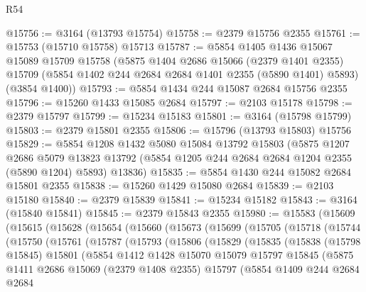 \begin{lexlean}{R54}
\begin{coremodule}
@15756 := @3164 (@13793 @15754)
@15758 := @2379 @15756 @2355
@15761 := @15753 (@15710 @15758) @15713
@15787 := @5854
    @1405
    @1436
    @15067
    @15089
    @15709
    @15758
    (@5875
      @1404
      @2686
      @15066
      (@2379 @1401 @2355)
      @15709
      (@5854 @1402 @244 @2684 @2684 @1401 @2355 (@5890 @1401) @5893)
      (@3854 @1400))
@15793 := @5854 @1434 @244 @15087 @2684 @15756 @2355
@15796 := @15260 @1433 @15085 @2684
@15797 := @2103 @15178
@15798 := @2379 @15797
@15799 := @15234 @15183
@15801 := @3164 (@15798 @15799)
@15803 := @2379 @15801 @2355
@15806 := @15796 (@13793 @15803) @15756
@15829 := @5854
    @1208
    @1432
    @5080
    @15084
    @13792
    @15803
    (@5875
      @1207
      @2686
      @5079
      @13823
      @13792
      (@5854 @1205 @244 @2684 @2684 @1204 @2355 (@5890 @1204) @5893)
      @13836)
@15835 := @5854 @1430 @244 @15082 @2684 @15801 @2355
@15838 := @15260 @1429 @15080 @2684
@15839 := @2103 @15180
@15840 := @2379 @15839
@15841 := @15234 @15182
@15843 := @3164 (@15840 @15841)
@15845 := @2379 @15843 @2355
@15980 := @15583
    (@15609
      (@15615
        (@15628
          (@15654
            (@15660
              (@15673
                (@15699
                  (@15705
                    (@15718
                      (@15744
                        (@15750
                          (@15761
                            (@15787
                              (@15793
                                (@15806
                                  (@15829
                                    (@15835
                                      (@15838
                                        (@15798 @15845)
                                        @15801
                                        (@5854
                                          @1412
                                          @1428
                                          @15070
                                          @15079
                                          @15797
                                          @15845
                                          (@5875
                                            @1411
                                            @2686
                                            @15069
                                            (@2379 @1408 @2355)
                                            @15797
                                            (@5854
                                              @1409
                                              @244
                                              @2684
                                              @2684

\end{coremodule}
\end{lexlean}
